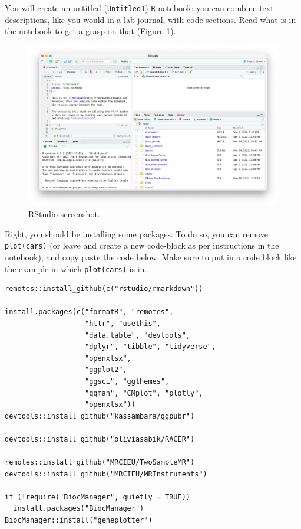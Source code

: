 \documentclass[
]{book}
\newcommand{\passthrough}[1]{#1}
\begin{document}
You will create an untitled (\passthrough{\lstinline!Untitled1!}) \passthrough{\lstinline!R!} notebook: you can combine text descriptions, like you would in a lab-journal, with code-sections. Read what is in the notebook to get a grasp on that (Figure \ref{fig:rstudioscreenshotnotebook}).

\begin{figure}[H]

{\centering \includegraphics[width=0.85\linewidth]{img/rstudio-screenshot-notebook} 

}

\caption{RStudio screenshot.}\label{fig:rstudioscreenshotnotebook}
\end{figure}

Right, you should be installing some packages. To do so, you can remove \passthrough{\lstinline!plot(cars)!} (or leave and create a new code-block as per instructions in the notebook), and copy paste the code below. Make sure to put in a code block like the example in which \passthrough{\lstinline!plot(cars)!} is in.

\begin{lstlisting}
remotes::install_github(c("rstudio/rmarkdown"))

install.packages(c("formatR", "remotes", 
                   "httr", "usethis", 
                   "data.table", "devtools", 
                   "dplyr", "tibble", "tidyverse", 
                   "openxlsx",
                   "ggplot2",
                   "ggsci", "ggthemes",
                   "qqman", "CMplot", "plotly", 
                   "openxlsx"))
devtools::install_github("kassambara/ggpubr")

devtools::install_github("oliviasabik/RACER")

remotes::install_github("MRCIEU/TwoSampleMR")
devtools::install_github("MRCIEU/MRInstruments")

if (!require("BiocManager", quietly = TRUE))
  install.packages("BiocManager")
BiocManager::install("geneplotter")
\end{lstlisting}
\end{document}
